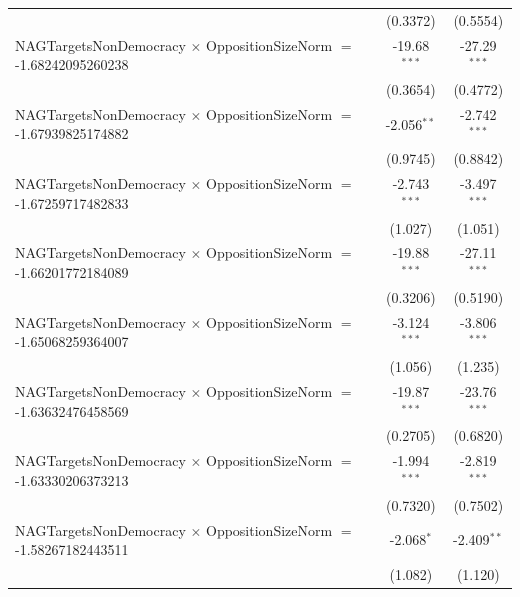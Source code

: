 \begin{tabular}{lcc}
                                                                                & (0.3372)             & (0.5554)\\   
   NAGTargetsNonDemocracy $\times$ OppositionSizeNorm $=$ -1.68242095260238     & -19.68$^{***}$       & -27.29$^{***}$\\   
                                                                                & (0.3654)             & (0.4772)\\   
   NAGTargetsNonDemocracy $\times$ OppositionSizeNorm $=$ -1.67939825174882     & -2.056$^{**}$        & -2.742$^{***}$\\   
                                                                                & (0.9745)             & (0.8842)\\   
   NAGTargetsNonDemocracy $\times$ OppositionSizeNorm $=$ -1.67259717482833     & -2.743$^{***}$       & -3.497$^{***}$\\   
                                                                                & (1.027)              & (1.051)\\   
   NAGTargetsNonDemocracy $\times$ OppositionSizeNorm $=$ -1.66201772184089     & -19.88$^{***}$       & -27.11$^{***}$\\   
                                                                                & (0.3206)             & (0.5190)\\   
   NAGTargetsNonDemocracy $\times$ OppositionSizeNorm $=$ -1.65068259364007     & -3.124$^{***}$       & -3.806$^{***}$\\   
                                                                                & (1.056)              & (1.235)\\   
   NAGTargetsNonDemocracy $\times$ OppositionSizeNorm $=$ -1.63632476458569     & -19.87$^{***}$       & -23.76$^{***}$\\   
                                                                                & (0.2705)             & (0.6820)\\   
   NAGTargetsNonDemocracy $\times$ OppositionSizeNorm $=$ -1.63330206373213     & -1.994$^{***}$       & -2.819$^{***}$\\   
                                                                                & (0.7320)             & (0.7502)\\   
   NAGTargetsNonDemocracy $\times$ OppositionSizeNorm $=$ -1.58267182443511     & -2.068$^{*}$         & -2.409$^{**}$\\   
                                                                                & (1.082)              & (1.120)\\   

\end{tabular}
